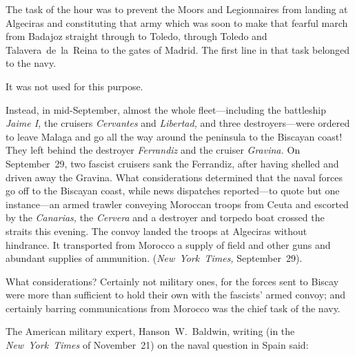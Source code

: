 The task of the hour was to prevent the Moors and Legionnaires from landing at Algeciras and constituting that army which was soon to make that fearful march from Badajoz straight through to Toledo, through Toledo and Talavera~de~la~Reina to the gates of Madrid. The first line in that task belonged to the navy.

\smallskip

It was not used for this purpose.

\smallskip

Instead, in mid-September, almost the whole fleet---including the battleship \emph{Jaime I,} the cruisers \emph{Cervantes} and \emph{Libertad,} and three destroyers---were ordered to leave Malaga and go all the way around the peninsula to the Biscayan coast! They left behind the destroyer \emph{Ferrandiz} and the cruiser \emph{Gravina.} On September~29, two fascist cruisers sank the Ferrandiz, after having shelled and driven away the Gravina. What considerations determined that the naval forces go off to the Biscayan coast, while news dispatches reported---to quote but one instance---an armed trawler conveying Moroccan troops from Ceuta and escorted by the \emph{Canarias,} the \emph{Cervera} and a destroyer and torpedo boat crossed the straits this evening. The convoy landed the troops at Algeciras without hindrance. It transported from Morocco a supply of field and other guns and abundant supplies of ammunition. (\emph{New~York~Times,} September~29).

What considerations? Certainly not military ones, for the forces sent to Biscay were more than sufficient to hold their own with the fascists’ armed convoy; and certainly barring communications from Morocco was the chief task of the navy.

The American military expert, Hanson~W.~Baldwin, writing (in the \emph{New~York~Times} of November~21) on the naval question in Spain said:

